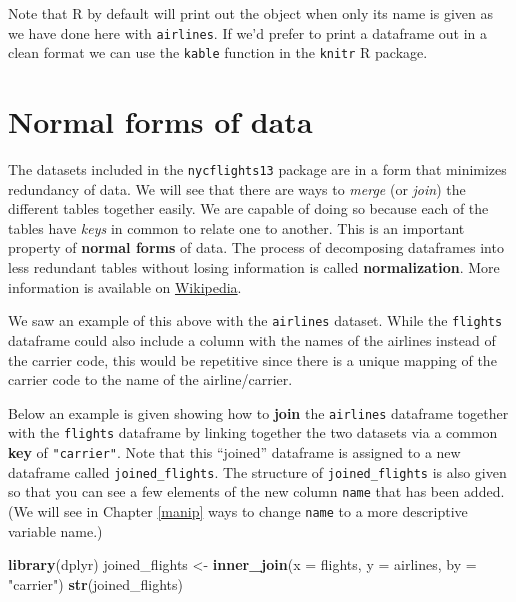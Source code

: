 \documentclass[]{tufte-book}
\newenvironment{Shaded}{\begin{snugshade}}{\end{snugshade}}
\newcommand{\KeywordTok}[1]{\textcolor[rgb]{0.13,0.29,0.53}{\textbf{{#1}}}}
\newcommand{\DataTypeTok}[1]{\textcolor[rgb]{0.13,0.29,0.53}{{#1}}}
\newcommand{\StringTok}[1]{\textcolor[rgb]{0.31,0.60,0.02}{{#1}}}
\newcommand{\NormalTok}[1]{{#1}}
\begin{document}
Note that R by default will print out the object when only its name is
given as we have done here with \texttt{airlines}. If we'd prefer to
print a dataframe out in a clean format we can use the \texttt{kable}
function in the \texttt{knitr} R package.

\section{Normal forms of data}\label{normal-forms-of-data}

The datasets included in the \texttt{nycflights13} package are in a form
that minimizes redundancy of data. We will see that there are ways to
\emph{merge} (or \emph{join}) the different tables together easily. We
are capable of doing so because each of the tables have \emph{keys} in
common to relate one to another. This is an important property of
\textbf{normal forms} of data. The process of decomposing dataframes
into less redundant tables without losing information is called
\textbf{normalization}. More information is available on
\href{https://en.wikipedia.org/wiki/Database_normalization}{Wikipedia}.

We saw an example of this above with the \texttt{airlines} dataset.
While the \texttt{flights} dataframe could also include a column with
the names of the airlines instead of the carrier code, this would be
repetitive since there is a unique mapping of the carrier code to the
name of the airline/carrier.

Below an example is given showing how to \textbf{join} the
\texttt{airlines} dataframe together with the \texttt{flights} dataframe
by linking together the two datasets via a common \textbf{key} of
\texttt{"carrier"}. Note that this ``joined'' dataframe is assigned to a
new dataframe called \texttt{joined\_flights}. The structure of
\texttt{joined\_flights} is also given so that you can see a few
elements of the new column \texttt{name} that has been added. (We will
see in Chapter \ref{manip} ways to change \texttt{name} to a more
descriptive variable name.)

\begin{Shaded}
\begin{Highlighting}[]
\KeywordTok{library}\NormalTok{(dplyr)}
\NormalTok{joined_flights <-}\StringTok{ }\KeywordTok{inner_join}\NormalTok{(}\DataTypeTok{x =} \NormalTok{flights, }\DataTypeTok{y =} \NormalTok{airlines, }\DataTypeTok{by =} \StringTok{"carrier"}\NormalTok{)}
\KeywordTok{str}\NormalTok{(joined_flights)}
\end{Highlighting}
\end{Shaded}
\end{document}
